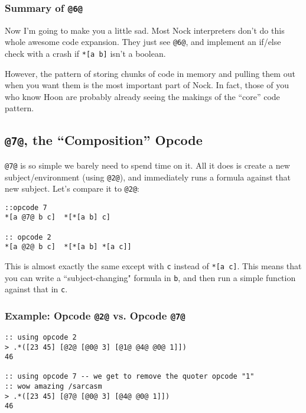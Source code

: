 \documentclass[twoside]{article}
\begin{document}
\subsubsection{Summary of \lstinline[style=inlinecode]{@6@}}

Now I'm going to make you a little sad. Most Nock interpreters don't do this whole awesome code expansion. They just see \lstinline[style=inlinecode]{@6@}, and implement an if/else check with a crash if \lstinline[style=inlinecode]{*[a b]} isn't a boolean.

However, the pattern of storing chunks of code in memory and pulling them out when you want them is the most important part of Nock. In fact, those of you who know Hoon are probably already seeing the makings of the ``core'' code pattern.

\subsection{\lstinline[style=inlinecode]{@7@}, the “Composition” Opcode}

\lstinline[style=inlinecode]{@7@} is so simple we barely need to spend time on it. All it does is create a new subject/environment (using \lstinline[style=inlinecode]{@2@}), and immediately runs a formula against that new subject. Let's compare it to \lstinline[style=inlinecode]{@2@}:

\begin{lstlisting}[style=listingcode]
::opcode 7
*[a @7@ b c]  *[*[a b] c]

:: opcode 2
*[a @2@ b c]  *[*[a b] *[a c]]
\end{lstlisting}

This is almost exactly the same except with \lstinline[style=inlinecode]{c} instead of \lstinline[style=inlinecode]{*[a c]}. This means that you can write a ``subject-changing" formula in \lstinline[style=inlinecode]{b}, and then run a simple function against that in \lstinline[style=inlinecode]{c}.

\subsubsection{Example: Opcode \lstinline[style=inlinecode]{@2@} vs. Opcode \lstinline[style=inlinecode]{@7@}}

\begin{lstlisting}[style=listingcode]
:: using opcode 2
> .*([23 45] [@2@ [@0@ 3] [@1@ @4@ @0@ 1]])
46

:: using opcode 7 -- we get to remove the quoter opcode "1"
:: wow amazing /sarcasm
> .*([23 45] [@7@ [@0@ 3] [@4@ @0@ 1]])
46
\end{lstlisting}
\end{document}
